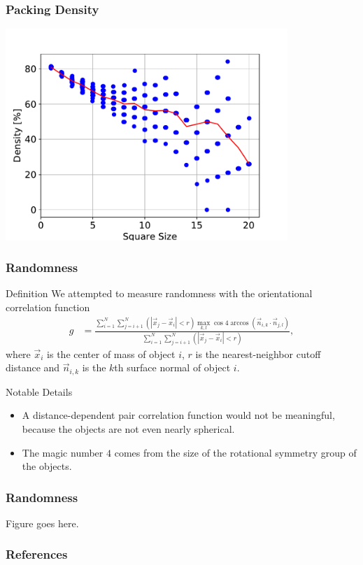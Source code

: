 \documentclass[sumlimits, intlimits]{beamer}
\begin{document}
\begin{frame}
\frametitle{Packing Density}
\centering
\def \h{8cm}
\includegraphics[height=\h]{box2d}
\end{frame}

\begin{frame}
\frametitle{Randomness}
\begin{block}{Definition}
We attempted to measure randomness with the orientational correlation function
\begin{align*}
g & = \frac{\sum_{i = 1}^N \sum_{j = i + 1}^N (|\vec x_j - \vec x_i| < r) \max_{k, l} \cos 4 \arccos (\vec n_{i, k} \cdot \vec n_{j, l})}
{\sum_{i = 1}^N \sum_{j = i + 1}^N (|\vec x_j - \vec x_i| < r)},
\end{align*}
where $\vec x_i$ is the center of mass of object $i$,
$r$ is the nearest-neighbor cutoff distance and
$\vec n_{i, k}$ is the $k$th surface normal of object $i$.
\end{block}
\begin{block}{Notable Details}
\begin{itemize}
\item A distance-dependent pair correlation function would not be meaningful,
because the objects are not even nearly spherical.
\item The magic number $4$ comes from the size
of the rotational symmetry group of the objects.
\end{itemize}
\end{block}
\end{frame}

\begin{frame}
\frametitle{Randomness}
\centering
\def \h{8cm}
Figure goes here. %
\end{frame}

\begin{frame}[allowframebreaks]
\frametitle{References}
\printbibliography
\end{frame}
\end{document}
